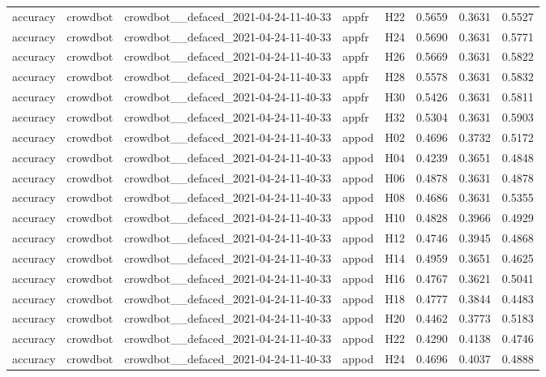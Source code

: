 \begin{table}[tbp]
\begin{tabular}{lllllrrr}
accuracy & crowdbot & crowdbot\_\_defaced\_2021-04-24-11-40-33 & appfr & H22 & 0.5659 & 0.3631 & 0.5527 \\
accuracy & crowdbot & crowdbot\_\_defaced\_2021-04-24-11-40-33 & appfr & H24 & 0.5690 & 0.3631 & 0.5771 \\
accuracy & crowdbot & crowdbot\_\_defaced\_2021-04-24-11-40-33 & appfr & H26 & 0.5669 & 0.3631 & 0.5822 \\
accuracy & crowdbot & crowdbot\_\_defaced\_2021-04-24-11-40-33 & appfr & H28 & 0.5578 & 0.3631 & 0.5832 \\
accuracy & crowdbot & crowdbot\_\_defaced\_2021-04-24-11-40-33 & appfr & H30 & 0.5426 & 0.3631 & 0.5811 \\
accuracy & crowdbot & crowdbot\_\_defaced\_2021-04-24-11-40-33 & appfr & H32 & 0.5304 & 0.3631 & 0.5903 \\
accuracy & crowdbot & crowdbot\_\_defaced\_2021-04-24-11-40-33 & appod & H02 & 0.4696 & 0.3732 & 0.5172 \\
accuracy & crowdbot & crowdbot\_\_defaced\_2021-04-24-11-40-33 & appod & H04 & 0.4239 & 0.3651 & 0.4848 \\
accuracy & crowdbot & crowdbot\_\_defaced\_2021-04-24-11-40-33 & appod & H06 & 0.4878 & 0.3631 & 0.4878 \\
accuracy & crowdbot & crowdbot\_\_defaced\_2021-04-24-11-40-33 & appod & H08 & 0.4686 & 0.3631 & 0.5355 \\
accuracy & crowdbot & crowdbot\_\_defaced\_2021-04-24-11-40-33 & appod & H10 & 0.4828 & 0.3966 & 0.4929 \\
accuracy & crowdbot & crowdbot\_\_defaced\_2021-04-24-11-40-33 & appod & H12 & 0.4746 & 0.3945 & 0.4868 \\
accuracy & crowdbot & crowdbot\_\_defaced\_2021-04-24-11-40-33 & appod & H14 & 0.4959 & 0.3651 & 0.4625 \\
accuracy & crowdbot & crowdbot\_\_defaced\_2021-04-24-11-40-33 & appod & H16 & 0.4767 & 0.3621 & 0.5041 \\
accuracy & crowdbot & crowdbot\_\_defaced\_2021-04-24-11-40-33 & appod & H18 & 0.4777 & 0.3844 & 0.4483 \\
accuracy & crowdbot & crowdbot\_\_defaced\_2021-04-24-11-40-33 & appod & H20 & 0.4462 & 0.3773 & 0.5183 \\
accuracy & crowdbot & crowdbot\_\_defaced\_2021-04-24-11-40-33 & appod & H22 & 0.4290 & 0.4138 & 0.4746 \\
accuracy & crowdbot & crowdbot\_\_defaced\_2021-04-24-11-40-33 & appod & H24 & 0.4696 & 0.4037 & 0.4888 \\

\end{tabular}
\end{table}
